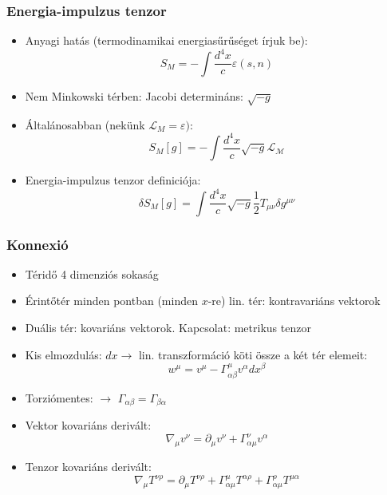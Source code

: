 \documentclass{beamer}
\begin{document}
\begin{frame}
\frametitle{Energia-impulzus tenzor}
\begin{itemize}
  \setlength{\itemsep}{14pt}
  \item Anyagi hatás (termodinamikai energiasűrűséget írjuk be): 
  \begin{equation}
  	S_M = -\int\frac{d^4x}{c}\varepsilon(s, n)
  \end{equation}
  \item Nem Minkowski térben: Jacobi determináns: $\sqrt{-g}$
  \item Általánosabban (nekünk $\mathcal{L}_M = \varepsilon)$:
  \begin{equation}
  	S_M[g] = -\int\frac{d^4x}{c} \sqrt{-g}\mathcal{L_M}
  \end{equation}
  \item Energia-impulzus tenzor definiciója:
  \begin{equation}
  \delta S_M[g] = \int \frac{d^4x}{c}\sqrt{-g}\frac{1}{2}T_{\mu\nu}\delta g^{\mu\nu}
  \end{equation}
\end{itemize}
\end{frame}


\begin{frame}
\frametitle{Konnexió}
\begin{itemize}
  \setlength{\itemsep}{10pt}
  	\item Téridő 4 dimenziós sokaság
	\item Érintőtér minden pontban (minden $x$-re) lin. tér: kontravariáns vektorok
	\item Duális tér: kovariáns vektorok. Kapcsolat: metrikus tenzor
	\item Kis elmozdulás: $dx\rightarrow$ lin. transzformáció köti össze a két tér elemeit:
	\begin{equation}
		w^\mu=v^\mu-\Gamma^\mu_{\alpha\beta}v^\alpha dx^\beta
	\end{equation}
	\item Torziómentes: $\rightarrow$ $\Gamma_{\alpha\beta}=\Gamma_{\beta\alpha}$
	\item Vektor kovariáns derivált:
	\begin{equation}
		\nabla_\mu v^\nu = \partial_\mu v^\nu+\Gamma^\nu_{\alpha\mu}v^\alpha
\end{equation}	
	\item Tenzor kovariáns derivált:
	\begin{equation}
		\nabla_\mu T^{\nu\rho} = \partial_\mu T^{\nu\rho} +\Gamma^\mu_{\alpha\mu}T^{
\alpha\rho} +\Gamma^\rho_{\alpha\mu}T^{
\mu\alpha}
\end{equation}	  
\end{itemize}
\end{frame}
\end{document}

